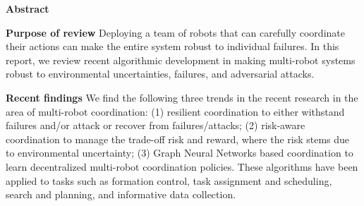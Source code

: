 
\author{Lifeng Zhou         \and
        Pratap Tokekar %
}



\date{Received: date / Accepted: date}


\maketitle

\noindent\textbf{Abstract}

\noindent\textbf{Purpose of review} Deploying a team of robots that can carefully coordinate their actions can make the entire system robust to individual failures. In this report, we review recent algorithmic development in making multi-robot systems robust to environmental uncertainties, failures, and adversarial attacks.  

\noindent\textbf{Recent findings} We find the following three trends in the recent research in the area of multi-robot coordination: (1) resilient coordination to either withstand failures and/or attack or recover from failures/attacks; (2) risk-aware coordination to manage the trade-off risk and reward, where the risk stems due to environmental uncertainty; (3) Graph Neural Networks based coordination to learn decentralized multi-robot coordination policies. These algorithms have been applied to tasks such as formation control, task assignment and scheduling, search and planning, and informative data collection.

